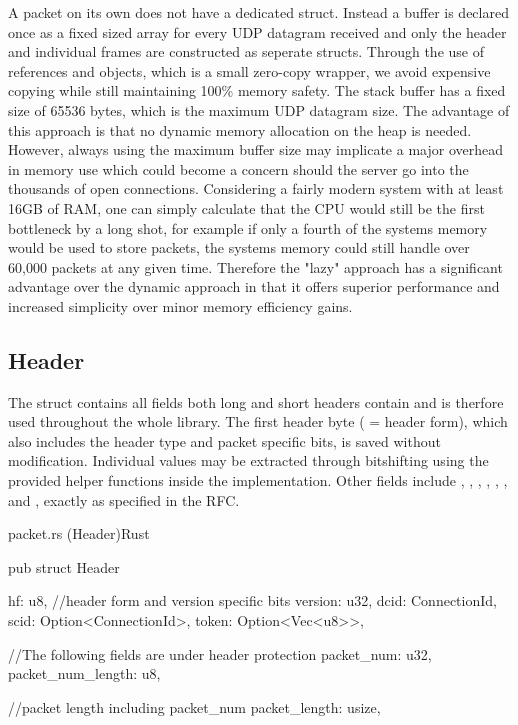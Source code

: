 A packet on its own does not have a dedicated struct. Instead a buffer is declared once as a fixed sized array for every UDP datagram received
and only the header and
individual frames are constructed as seperate structs. Through the use of references and  objects, which is a small
zero-copy wrapper, we avoid expensive copying while still maintaining 100\% memory safety. The stack buffer has a fixed size of 65536
bytes, which is the maximum UDP datagram size. The advantage of this approach is that no dynamic memory allocation on the heap is needed. However,
always using the maximum buffer size may implicate a major overhead in memory use which could become a concern should the server go into
the thousands of open connections. Considering a fairly modern system with at least 16GB of RAM, one can simply calculate that the CPU
would still be the first bottleneck by a long shot, for example if only a fourth of the systems memory would be used to store packets, the
systems memory could still handle over 60,000 packets at any given time. Therefore the "lazy" approach has a
significant advantage over the dynamic approach in that it offers superior performance and increased simplicity over minor memory efficiency gains.

\subsection{Header}

The  struct contains all fields both long and short headers contain and is therfore used throughout the whole library.
The first header byte ( = header form), which also includes the header type and packet specific bits, is saved without
modification. Individual values may be extracted through bitshifting using the provided helper functions inside the 
implementation. Other fields include , , ,
, , , and , exactly as specified
in the RFC.

\begin{codeblock}{packet.rs (Header)}{Rust}
  \begin{rustcode}
    pub struct Header {
        hf: u8, //header form and version specific bits
        version: u32,
        dcid: ConnectionId,
        scid: Option<ConnectionId>,
        token: Option<Vec<u8>>,

        //The following fields are under header protection
        packet_num: u32,
        packet_num_length: u8,

        //packet length including packet_num
        packet_length: usize,
    }
  \end{rustcode}
\end{codeblock}

